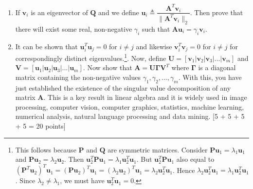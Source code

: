 \documentclass[11pt]{article}
\begin{document}
\begin{enumerate}
\begin{enumerate}
\item If $\boldsymbol{v}_i$ is an eigenvector of $\boldsymbol{Q}$ and we define $\boldsymbol{u}_i \triangleq \dfrac{\boldsymbol{A}^T \boldsymbol{v}_i}{\|\boldsymbol{A}^T \boldsymbol{v}_i\|_2}$. Then prove that there will exist some real, non-negative $\gamma_i$ such that $\boldsymbol{Au}_i = \gamma_i \boldsymbol{v}_i$.

\item It can be shown that $\boldsymbol{u}^T_i \boldsymbol{u}_j = 0$ for $i \neq j$ and likewise $\boldsymbol{v}^T_i \boldsymbol{v}_j = 0$ for $i \neq j$ for correspondingly distinct eigenvalues.\footnote{This follows because $\boldsymbol{P}$ and $\boldsymbol{Q}$ are symmetric matrices. Consider $\boldsymbol{Pu}_1 = \lambda_1 \boldsymbol{u}_1$ and $\boldsymbol{Pu}_2 = \lambda_2 \boldsymbol{u}_2$. Then $\boldsymbol{u}^T_2 \boldsymbol{P u}_1 = \lambda_1 \boldsymbol{u}^T_2 \boldsymbol{u}_1$. But $\boldsymbol{u}^T_2 \boldsymbol{P} \boldsymbol{u}_1$ also equal to $(\boldsymbol{P}^T \boldsymbol{u}_2)^T \boldsymbol{u}_1 = (\boldsymbol{P} \boldsymbol{u}_2)^T \boldsymbol{u}_1 = (\lambda_2 \boldsymbol{u}_2)^T \boldsymbol{u}_1 = \lambda_2 \boldsymbol{u}^T_2 \boldsymbol{u}_1$. Hence $\lambda_2 \boldsymbol{u}^T_2 \boldsymbol{u}_1 = \lambda_1 \boldsymbol{u}^T_2 \boldsymbol{u}_1$. Since $\lambda_2 \neq \lambda_1$, we must have $\boldsymbol{u}^T_2 \boldsymbol{u}_1 = 0$. }. Now, define $\boldsymbol{U} = [\boldsymbol{v}_1 | \boldsymbol{v}_2 | \boldsymbol{v}_3 | ...|\boldsymbol{v}_m]$ and $\boldsymbol{V} = [\boldsymbol{u}_1 | \boldsymbol{u}_2 | \boldsymbol{u}_3 | ... |\boldsymbol{u}_m]$. Now show that $\boldsymbol{A} = \boldsymbol{U} \boldsymbol{\Gamma} \boldsymbol{V}^T$ where $\boldsymbol{\Gamma}$ is a diagonal matrix containing the non-negative values $\gamma_1, \gamma_2, ..., \gamma_m$. With this, you have just established the existence of the singular value decomposition of any matrix $\boldsymbol{A}$. This is a key result in linear algebra and it is widely used in image processing, computer vision, computer graphics, statistics, machine learning, numerical analysis, natural language processing and data mining. \textsf[5 + 5 + 5 + 5 = 20 points]
\end{enumerate}




\end{enumerate}
\end{document}

